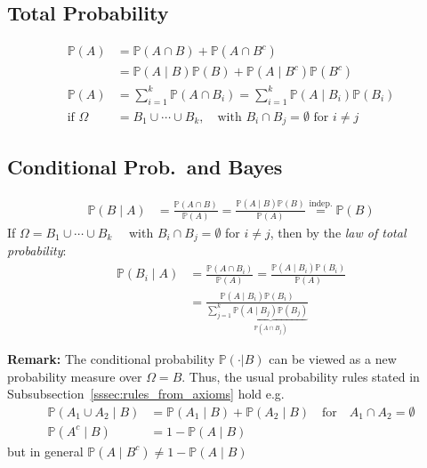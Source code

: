 \subsection{Total Probability}
\noindent\begin{align*}
    \mathbb{P}(A)     & =\mathbb{P}(A\cap B)+\mathbb{P}(A\cap B^c)                                           \\
                      & =\mathbb{P}(A\mid B)\mathbb{P}(B)+\mathbb{P}(A\mid B^c)\mathbb{P}(B^c)               \\[.25em]
    \mathbb{P}(A)     & =\sum_{i=1}^k\mathbb{P}(A\cap B_i) =\sum_{i=1}^k\mathbb{P}(A\mid B_i)\mathbb{P}(B_i) \\
    \text{if } \Omega & =B_1\cup\cdots\cup B_k,\quad\text{with }B_i\cap B_j=\emptyset\text{ for }i\neq j
\end{align*}
\subsection{Conditional Prob.\ and Bayes}
\noindent\begin{align*}
    \mathbb{P}(B\mid A) & =\frac{\mathbb{P}(A\cap B)}{\mathbb{P}(A)}=\frac{\mathbb{P}(A\mid B)\mathbb{P}(B)}{\mathbb{P}(A)} \overset{\text{indep.}}{=} \mathbb{P}(B)
\end{align*}
If $\Omega=B_1\cup\cdots\cup B_k\quad$ with $B_i\cap B_j=\emptyset$ for $i\neq j$, then by the \textit{law of total probability}:
\noindent\begin{align*}
    \mathbb{P}(B_i\mid A) & =\frac{\mathbb{P}(A\cap B_i)}{\mathbb{P}(A)}=\frac{\mathbb{P}(A\mid B_i)\mathbb{P}(B_i)}{\mathbb{P}(A)}                              \\
                          & =\frac{\mathbb{P}(A\mid B_i)\mathbb{P}(B_i)}{\sum_{j=1}^k \underbrace{\mathbb{P}(A\mid B_j)\mathbb{P}(B_j)}_{\mathbb{P}(A\cap B_j)}}
\end{align*}

\textbf{Remark:} The conditional probability $\mathbb{P}(\cdot|B)$ can be viewed as a new probability measure over $\Omega=B$. Thus, the usual probability rules stated in Subsubsection\ \ref{sssec:rules_from_axioms} hold e.g.\:
\begin{align*}
    \mathbb{P}(A_1\cup A_2\mid B) & =\mathbb{P}(A_1\mid B)+\mathbb{P}(A_2\mid B)\quad\text{for}\quad A_1\cap A_2=\emptyset \\
    \mathbb{P}(A^c\mid B)         & =1-\mathbb{P}(A\mid B)
\end{align*}
but in general $\mathbb{P}(A\mid B^c)\neq1-\mathbb{P}(A\mid B)$
